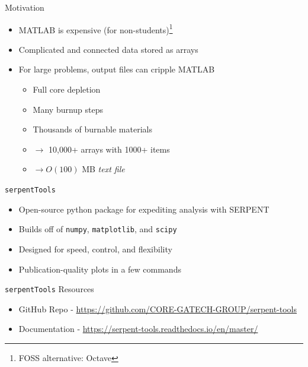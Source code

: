 \documentclass{beamer}
\newcommand{\st}{\texttt{serpentTools} }
\begin{document}
\begin{frame}{Motivation}
    \begin{itemize}
        \item MATLAB is expensive (for non-students)\footnote{FOSS alternative: Octave}
        \item Complicated and connected data stored as arrays
        \item For large problems, output files can cripple MATLAB
        \begin{itemize}
            \item Full core depletion
            \item Many burnup steps
            \item Thousands of burnable materials
            \item $\rightarrow$ 10,000+ arrays with 1000+ items
            \item $\rightarrow O(100)$ MB \textit{text file}
        \end{itemize}
    \end{itemize}
\end{frame}

\begin{frame}{\st}
    \begin{itemize}
        \item Open-source python package for expediting analysis with SERPENT
        \item Builds off of \texttt{numpy}, \texttt{matplotlib}, and \texttt{scipy}
        \item Designed for speed, control, and flexibility
        \item Publication-quality plots in a few commands
    \end{itemize}
\end{frame}


\begin{frame}{\st Resources}
    \begin{itemize}
        \item GitHub Repo - \url{https://github.com/CORE-GATECH-GROUP/serpent-tools}
        \item Documentation - \url{https://serpent-tools.readthedocs.io/en/master/}
    \end{itemize}
\end{frame}
\end{document}
